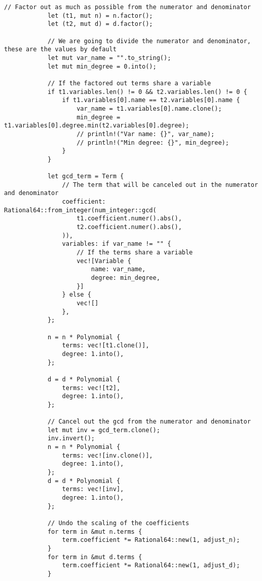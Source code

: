 {\begin{lstlisting}[caption={The implementation of the \texttt{simplify()} method for the \texttt{PolyRatio} struct}, label={lst:polyratio-simplify}]
            // Factor out as much as possible from the numerator and denominator
            let (t1, mut n) = n.factor();
            let (t2, mut d) = d.factor();
    
            // We are going to divide the numerator and denominator, these are the values by default
            let mut var_name = "".to_string();
            let mut min_degree = 0.into();
    
            // If the factored out terms share a variable
            if t1.variables.len() != 0 && t2.variables.len() != 0 {
                if t1.variables[0].name == t2.variables[0].name {
                    var_name = t1.variables[0].name.clone();
                    min_degree = t1.variables[0].degree.min(t2.variables[0].degree);
                    // println!("Var name: {}", var_name);
                    // println!("Min degree: {}", min_degree);
                }
            }
    
            let gcd_term = Term {
                // The term that will be canceled out in the numerator and denominator
                coefficient: Rational64::from_integer(num_integer::gcd(
                    t1.coefficient.numer().abs(),
                    t2.coefficient.numer().abs(),
                )),
                variables: if var_name != "" {
                    // If the terms share a variable
                    vec![Variable {
                        name: var_name,
                        degree: min_degree,
                    }]
                } else {
                    vec![]
                },
            };

            n = n * Polynomial {
                terms: vec![t1.clone()],
                degree: 1.into(),
            };

            d = d * Polynomial {
                terms: vec![t2],
                degree: 1.into(),
            };
    
            // Cancel out the gcd from the numerator and denominator
            let mut inv = gcd_term.clone();
            inv.invert();
            n = n * Polynomial {
                terms: vec![inv.clone()],
                degree: 1.into(),
            };
            d = d * Polynomial {
                terms: vec![inv],
                degree: 1.into(),
            };
    
            // Undo the scaling of the coefficients
            for term in &mut n.terms {
                term.coefficient *= Rational64::new(1, adjust_n);
            }
            for term in &mut d.terms {
                term.coefficient *= Rational64::new(1, adjust_d);
            }
    

\end{lstlisting}}
